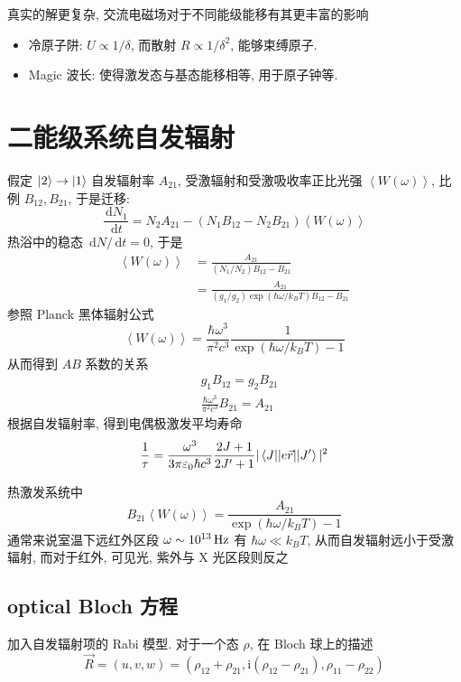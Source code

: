 \documentclass[10pt,a4paper,twocolumn]{article} %
\numberwithin{equation}{section} %
\newcommand{\dif}{\,\mathrm d}
\newcommand\mi{\mathrm{i}}
\begin{document}
真实的解更复杂, 交流电磁场对于不同能级能移有其更丰富的影响
\begin{itemize}
	\item 冷原子阱: $U\propto 1/\delta$, 而散射 $R\propto 1/\delta^2$, 
	能够束缚原子. 
	\item Magic 波长: 使得激发态与基态能移相等, 用于原子钟等.
\end{itemize}
\section{二能级系统自发辐射} %
\label{sec:spontaneous_emission}
假定 $\ket{2}\to\ket{1}$ 自发辐射率 $A_{21}$, 受激辐射和受激吸收率正比光强
$\left\langle W(\omega)\right\rangle$, 比例 $B_{12}, B_{21}$, 于是迁移: 
\begin{equation}
	\frac{\dif N_1}{\dif t} = N_2 A_{21} - (N_1 B_{12} - N_2 B_{21})
	\left\langle W(\omega)\right\rangle
\end{equation}
热浴中的稳态 $\dif N/\dif t = 0$, 于是
\begin{align}
	\left\langle W(\omega)\right\rangle 
	&= \frac{A_{21}}{(N_1/N_2)B_{12} - B_{21}} \\
	&= \frac{A_{21}}{(g_1/g_2)\exp(\hbar\omega/k_BT)B_{12} - B_{21}}
\end{align}
参照 Planck 黑体辐射公式
\begin{equation}
	\left\langle W(\omega)\right\rangle = \frac{\hbar\omega^3}{\pi^2c^3}
	\frac{1}{\exp(\hbar\omega/k_BT) - 1}
\end{equation}
从而得到 $AB$ 系数的关系
\begin{align}
	& g_1 B_{12} = g_2 B_{21} \\
	&\frac{\hbar\omega^3}{\pi^2c^3}B_{21} = A_{21}
\end{align}
根据自发辐射率, 得到电偶极激发平均寿命
\begin{equation}
	\frac 1\tau = \frac{\omega^3}{3\pi\varepsilon_0\hbar c^3}
	\frac{2J+1}{2J'+1}|\braket{J||e\vec r||J'}|^2
\end{equation}

热激发系统中
\begin{equation}
	B_{21}\left\langle W(\omega)\right\rangle = 
	\frac{A_{21}}{\exp(\hbar\omega/k_BT) - 1}
\end{equation}
通常来说室温下远红外区段 $\omega\sim \SI{E13}{Hz}$ 有 $\hbar\omega\ll k_BT$, 
从而自发辐射远小于受激辐射, 而对于红外, 可见光, 紫外与 X 光区段则反之
\subsection{optical Bloch 方程} %
\label{sub:optical_bloch}
加入自发辐射项的 Rabi 模型. 对于一个态 $\rho$, 在 Bloch 球上的描述
\begin{equation}
	\vec R = (u, v, w) = 
	(\rho_{12} + \rho_{21}, \mi(\rho_{12} - \rho_{21}),  \rho_{11} - \rho_{22})
\end{equation}
\end{document}
